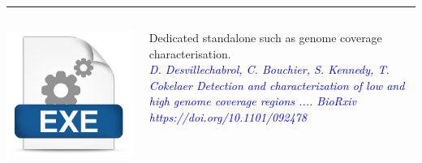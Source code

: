 \documentclass{beamer}
\begin{document}
\begin{frame}
\rule{\textwidth}{1pt}


\begin{columns}
\begin{column}{1.5cm}
\includegraphics[height=0.2\textheight]{images/exe.png}
\end{column}
\begin{column}{9cm}
Dedicated standalone such as genome coverage characterisation.\\
{\footnotesize \textcolor{blue}{\textit{D. Desvillechabrol, C. 
Bouchier, S. Kennedy, T. Cokelaer Detection and characterization of low 
and high genome coverage regions .... BioRxiv 
https://doi.org/10.1101/092478 }}}
\end{column}
\end{columns}
\end{frame}
\end{document}

